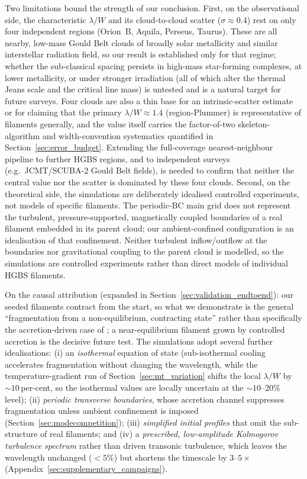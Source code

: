\documentclass[usenatbib,twoside,twocolumn]{mnras}
\begin{document}
Two limitations bound the strength of our conclusion. First, on the observational side, the characteristic $\lambda/W$ and its cloud-to-cloud scatter ($\sigma\approx0.4$) rest on only four independent regions (Orion~B, Aquila, Perseus, Taurus). These are all nearby, low-mass Gould Belt clouds of broadly solar metallicity and similar interstellar radiation field, so our result is established only for that regime; whether the sub-classical spacing persists in high-mass star-forming complexes, at lower metallicity, or under stronger irradiation (all of which alter the thermal Jeans scale and the critical line mass) is untested and is a natural target for future surveys. Four clouds are also a thin base for an intrinsic-scatter estimate or for claiming that the primary $\lambda/W\approx1.4$ (region-Plummer) is representative of filaments generally, and the value itself carries the factor-of-two skeleton-algorithm and width-convention systematics quantified in Section~\ref{sec:error_budget}. Extending the full-coverage nearest-neighbour pipeline to further HGBS regions, and to independent surveys (e.g.\ JCMT/SCUBA-2 Gould Belt fields), is needed to confirm that neither the central value nor the scatter is dominated by these four clouds. Second, on the theoretical side, the simulations are deliberately idealised controlled experiments, not models of specific filaments. The periodic-BC main grid does not represent the turbulent, pressure-supported, magnetically coupled boundaries of a real filament embedded in its parent cloud; our ambient-confined configuration is an idealisation of that confinement. Neither turbulent inflow/outflow at the boundaries nor gravitational coupling to the parent cloud is modelled, so the simulations are controlled experiments rather than direct models of individual HGBS filaments.

On the causal attribution (expanded in Section~\ref{sec:validation_endtoend}): our seeded filaments contract from the start, so what we demonstrate is the general ``fragmentation from a non-equilibrium, contracting state'' rather than specifically the accretion-driven case of \citet{Clarke2016,Clarke2017}; a near-equilibrium filament grown by controlled accretion is the decisive future test. The simulations adopt several further idealisations: (i) an \emph{isothermal} equation of state (sub-isothermal cooling accelerates fragmentation without changing the wavelength, while the temperature-gradient run of Section~\ref{sec:mt_variation} shifts the local $\lambda/W$ by $\sim10$\,per-cent, so the isothermal values are locally uncertain at the $\sim10$--$20\%$ level); (ii) \emph{periodic transverse boundaries}, whose accretion channel suppresses fragmentation unless ambient confinement is imposed (Section~\ref{sec:modecompetition}); (iii) \emph{simplified initial profiles} that omit the sub-structure of real filaments; and (iv) a \emph{prescribed, low-amplitude Kolmogorov turbulence spectrum} rather than driven transonic turbulence, which leaves the wavelength unchanged ($<5\%$) but shortens the timescale by $3$--$5\times$ (Appendix~\ref{sec:supplementary_campaigns}).
\end{document}
